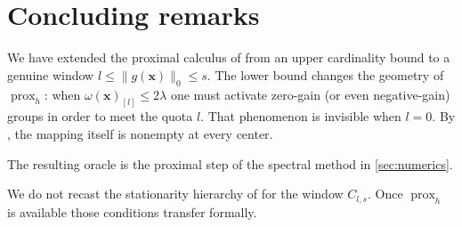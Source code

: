 \documentclass[11pt,a4paper]{article}
\theoremstyle{plain}
\theoremstyle{definition}
\theoremstyle{remark}
\newcommand*\x{\mathbf{x}}
\newcommand*\prox{\operatorname{prox}}
\begin{document}
\section{Concluding remarks}
\label{sec:end}

We have extended the proximal calculus of \cite{beck2018} from an upper cardinality bound to a genuine window \(l\le\|g(\x)\|_0\le s\).
The lower bound changes the geometry of \(\prox_h\): when \(\omega(\x)_{[l]}\le 2\lambda\) one must activate zero-gain (or even negative-gain) groups in order to meet the quota \(l\).
That phenomenon is invisible when \(l=0\).
By , the mapping itself is nonempty at every center.

The resulting oracle is the proximal step of the spectral method in \cref{sec:numerics}.

We do not recast the stationarity hierarchy of \cite{beck2018} for the window \(C_{l,s}\).
Once \(\prox_h\) is available those conditions transfer formally.



\end{document}
